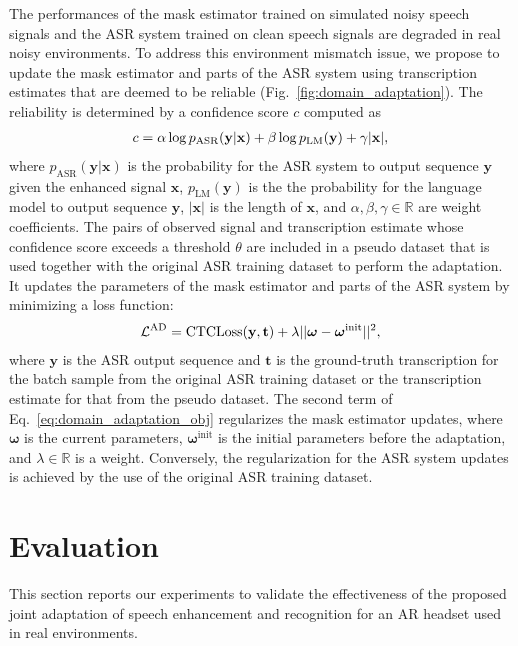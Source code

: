 \documentclass[a4paper]{article}
\def\t{\mathbf{t}}
\def\x{\mathbf{x}}
\def\y{\mathbf{y}}
\begin{document}
The performances of
the mask estimator trained on simulated noisy speech signals and
the ASR system trained on clean speech signals
are degraded in real noisy environments.
To address this environment mismatch issue,
we propose to update the mask estimator and parts of the ASR system
using transcription estimates that are deemed to be reliable
(Fig.~\ref{fig:domain_adaptation}).
The reliability is determined by a confidence score $c$ computed as 
\begin{align}
  c = \alpha \log p_\mathrm{ASR}(\y | \x) + \beta \log p_\mathrm{LM}(\y) + \gamma \qty|\x|,
  \label{eq:filtering}
\end{align}
where $p_\mathrm{ASR}(\y | \x)$ is the probability for the ASR system
to output sequence $\y$ given the enhanced signal $\x$,
$p_\mathrm{LM}(\y)$ is the the probability for the language model to output sequence $\y$,
$|\x|$ is the length of $\x$,
and $\alpha, \beta, \gamma \in \mathbb{R}$
are weight coefficients.
The pairs of observed signal and transcription estimate
whose confidence score exceeds a threshold $\theta$
are included in a pseudo dataset
that is used together with the original ASR training dataset to perform the adaptation.
It updates the parameters of the mask estimator and parts of the ASR system 
by minimizing a loss function:
\begin{align}
  \mathcal{L}^\text{AD} = \mathrm{CTCLoss}(\y, \t)
  + \lambda \qty||\boldsymbol{\omega} - \boldsymbol{\omega}^\mathrm{init}||^2,
  \label{eq:domain_adaptation_obj}
\end{align}
where $\y$ is the ASR output sequence and
$\t$ is
the ground-truth transcription for the batch sample from the original ASR training dataset or the transcription estimate for that from the pseudo dataset.
The second term of Eq.~\eqref{eq:domain_adaptation_obj}
regularizes the mask estimator updates,
where
$\boldsymbol{\omega}$ is the current parameters,
$\boldsymbol{\omega}^\mathrm{init}$ is the initial parameters before the adaptation,
and $\lambda \in \mathbb{R}$ is a weight.
Conversely, the regularization for the ASR system updates is achieved by the use of the original ASR training dataset.

\section{Evaluation}
\label{sec:evaluation}

This section reports our experiments
to validate the effectiveness of
the proposed joint adaptation of speech enhancement and recognition for an AR headset used in real environments.
\end{document}
